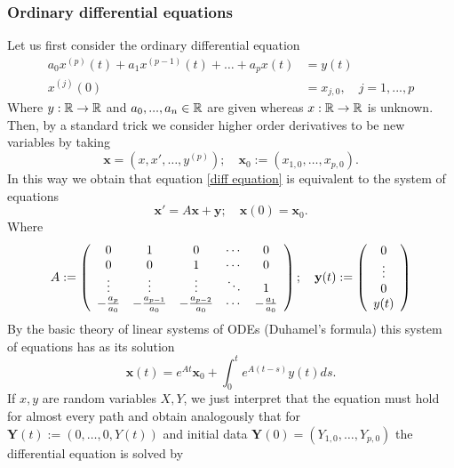 \documentclass[12pt]{article}
\begin{document}
\subsubsection{Ordinary differential equations}
Let us first consider the ordinary differential equation
\begin{align}\label{diff equation}
	a_0x^{(p)}(t)+a_1x^{(p-1)}(t)+\ldots+a_px(t) & =y(t) \\ x^{(j)}(0)&=x_{j,0},\quad j=1,...,p
\end{align}
Where $y:{\mathbb R}\to{\mathbb R}$ and $a_0,...,a_n\in{\mathbb R}$ are given whereas  $x:{\mathbb R}\to{\mathbb R}$ is unknown. Then, by a standard trick we consider higher order derivatives to be new variables by taking $$\mathbf{x}=(x,x',\ldots,y^{(p)});\quad \textbf{x}_0:=(x_{1,0},\ldots,x_{p,0}).$$  In this way we obtain that  equation \eqref{diff equation} is equivalent to the system of equations
\begin{equation*}
	\mathbf{x}'=A\mathbf{x}+\mathbf{y};\quad \mathbf{x}(0)=\textbf{x}_0.
\end{equation*}
Where
\begin{equation}\label{A def}
	A:=\left(\begin{array}{ccccc}
			0                  & 1                    & 0                    & \cdots & 0                  \\
			0                  & 0                    & 1                    & \cdots & 0                  \\
			\vdots             & \vdots               & \vdots               & \ddots & 1                  \\
			-\frac{a_{p}}{a_0} & -\frac{a_{p-1}}{a_0} & -\frac{a_{p-2}}{a_0} & \cdots & -\frac{a_{1}}{a_0}
		\end{array}\right);\quad \mathbf{y}(t):= \qty(\begin{array}{c}
			0      \\
			\vdots \\
			0      \\
			y(t)
		\end{array})
\end{equation}
By the basic theory of linear systems of ODEs (Duhamel's formula) this system of equations has as its solution
\begin{equation*}
	\textbf{x}(t)=e^{A t}\textbf{x}_0+\int_{0}^t e^{A(t-s)}y(t)ds.
\end{equation*}
If $x,y$ are random variables  $X,Y$, we just interpret that the equation must hold for almost every path and obtain analogously that for $\mathbf{Y}(t):=(0,\ldots,0,Y(t))$ and initial data $\mathbf{Y}(0)=(Y_{1,0},\ldots,Y_{p,0})$ the differential equation is solved by
\end{document}

